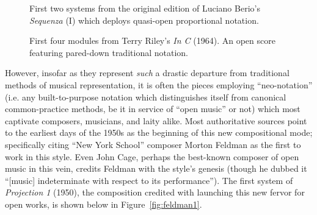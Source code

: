          \begin{figure}
            \centering
            \captionsetup{width=.5\textwidth}
            \caption[First two systems from the original edition of Luciano Berio's \textit{Sequenza} (I, 1958) which deploys quasi-open proportional notation.]{First two systems from the original edition of Luciano Berio's \textit{Sequenza} (I) which deploys quasi-open proportional notation.\footnotemark}
            \label{fig:sequenza}
        \end{figure}

            \begin{figure}
            \centering
            \captionsetup{width=.5\textwidth}
            \caption[First four modules from Terry Riley's \textit{In C} (1964).]{First four modules from Terry Riley's \textit{In C} (1964). An open score featuring pared-down traditional notation.\footnotemark}
            \label{fig:inc}
        \end{figure}

    However, insofar as they represent \textit{such} a drastic departure from traditional methods of musical representation, it is often the pieces employing ``neo-notation'' (i.e. any built-to-purpose notation which distinguishes itself from canonical common-practice methods, be it in service of ``open music'' or not) which most captivate composers, musicians, and laity alike. Most authoritative sources point to the earliest days of the 1950s as the beginning of this new compositional mode; specifically citing ``New York School'' composer Morton Feldman as the first to work in this style. Even John Cage, perhaps the best-known composer of open music in this vein, credits Feldman with the style's genesis (though he dubbed it ``[music] indeterminate with respect to its performance'').\autocite{Dohoney_2017} The first system of \textit{Projection 1} (1950), the composition credited with launching this new fervor for open works, is shown below in Figure~\ref{fig:feldman1}.

